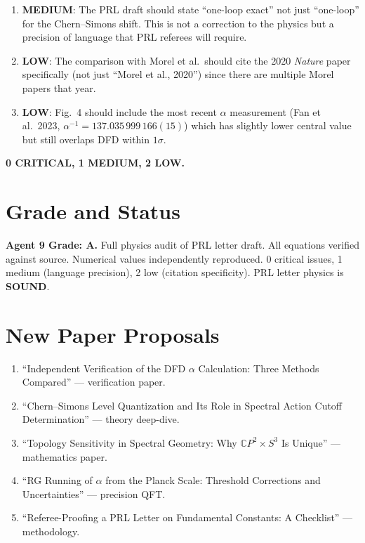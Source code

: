 \documentclass[11pt,a4paper]{article}
\newcommand{\CP}{\mathbb{C}P}
\begin{document}
\begin{enumerate}
\item \textbf{MEDIUM}: The PRL draft should state ``one-loop exact'' not just ``one-loop'' for the Chern--Simons shift. This is not a correction to the physics but a precision of language that PRL referees will require.

\item \textbf{LOW}: The comparison with Morel et al.\ should cite the 2020 \textit{Nature} paper specifically (not just ``Morel et al., 2020'') since there are multiple Morel papers that year.

\item \textbf{LOW}: Fig.~4 should include the most recent $\alpha$ measurement (Fan et al.\ 2023, $\alpha^{-1} = 137.035\,999\,166(15)$) which has slightly lower central value but still overlaps DFD within $1\sigma$.
\end{enumerate}

\textbf{0 CRITICAL, 1 MEDIUM, 2 LOW.}

\section{Grade and Status}

\begin{tcolorbox}[colback=green!5!white,colframe=green!40!black]
\textbf{Agent 9 Grade: A.} Full physics audit of PRL letter draft. All equations verified against source. Numerical values independently reproduced. 0 critical issues, 1 medium (language precision), 2 low (citation specificity). PRL letter physics is \textbf{SOUND}.
\end{tcolorbox}

\section{New Paper Proposals}

\begin{enumerate}
\item ``Independent Verification of the DFD $\alpha$ Calculation: Three Methods Compared'' --- verification paper.
\item ``Chern--Simons Level Quantization and Its Role in Spectral Action Cutoff Determination'' --- theory deep-dive.
\item ``Topology Sensitivity in Spectral Geometry: Why $\CP^2 \times S^3$ Is Unique'' --- mathematics paper.
\item ``RG Running of $\alpha$ from the Planck Scale: Threshold Corrections and Uncertainties'' --- precision QFT.
\item ``Referee-Proofing a PRL Letter on Fundamental Constants: A Checklist'' --- methodology.
\end{enumerate}
\end{document}
